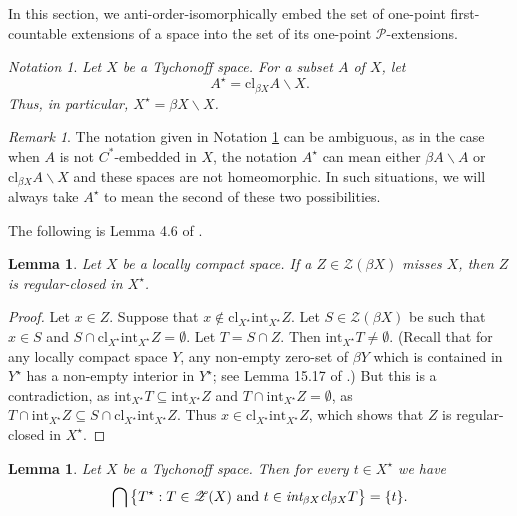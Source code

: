 \documentclass{amsart}
\newtheorem{lemma}[theorem]{Lemma}
\theoremstyle{definition}
\theoremstyle{remark}
\newtheorem{remark}[theorem]{Remark}
\theoremstyle{notation}
\newtheorem{notation}[theorem]{Notation}
\numberwithin{equation}{section}
\begin{document}
In this section, we anti-order-isomorphically embed the set of one-point first-countable  extensions of a space  into the set of its one-point ${\mathcal P}$-extensions.

\begin{notation}\label{KKJB}
{\em Let $X$ be a Tychonoff space. For a subset $A$ of $X$, let
\[A^\star=\mbox{cl}_{\beta X}A\backslash X.\]
Thus, in particular,  $X^\star=\beta X\backslash X$.}
\end{notation}

\begin{remark}\label{HFS}
The notation given in Notation \ref{KKJB} can be ambiguous, as in the case when $A$ is not $C^*$-embedded in $X$, the notation $A^\star$ can mean either $\beta A\backslash A$ or $\mbox{cl}_{\beta X}A\backslash X$ and these spaces are not homeomorphic. In such situations, we will always take $A^\star$ to mean the second of these two possibilities.
\end{remark}

The following is Lemma 4.6 of \cite{Ko2}.

\begin{lemma}\label{HSJHG}
Let $X$ be a  locally compact space. If a $Z\in {\mathscr Z}(\beta X)$  misses $X$, then $Z$ is regular-closed in $X^\star$.
\end{lemma}

\begin{proof}
Let $x\in Z$. Suppose that  $x\notin \mbox{cl}_{X^\star}\mbox{int}_{X^\star} Z$. Let $S\in {\mathscr Z}(\beta X)$ be such that $x\in S$ and  $S\cap  \mbox{cl}_{X^\star}\mbox{int}_{X^\star} Z=\emptyset$. Let $T=S\cap Z$. Then  $\mbox{int}_{X^\star} T\neq\emptyset$. (Recall that for any locally compact space $Y$, any non-empty zero-set of $\beta Y$ which is contained in  $Y^\star$ has a non-empty interior in $Y^\star$; see Lemma 15.17 of \cite{CN}.) But this is a contradiction, as
$\mbox{int}_{X^\star} T\subseteq\mbox{int}_{X^\star} Z$ and $T\cap\mbox{int}_{X^\star} Z=\emptyset$, as $T\cap\mbox{int}_{X^\star} Z\subseteq S\cap\mbox{cl}_{X^\star} \mbox{int}_{X^\star} Z$. Thus
$x\in \mbox{cl}_{X^\star}\mbox{int}_{X^\star} Z$, which shows that $Z$ is regular-closed in $X^\star$.
\end{proof}

\begin{lemma}\label{KLB}
Let $X$ be a Tychonoff space. Then for every $t\in X^\star$ we have
\[\bigcap\big\{T^\star:T\in {\mathscr Z}(X)\mbox{ and }t\in\mbox{\em int}_{\beta X}\mbox{\em cl}_{\beta X}T\big\}=\{t\}.\]
\end{lemma}
\end{document}
